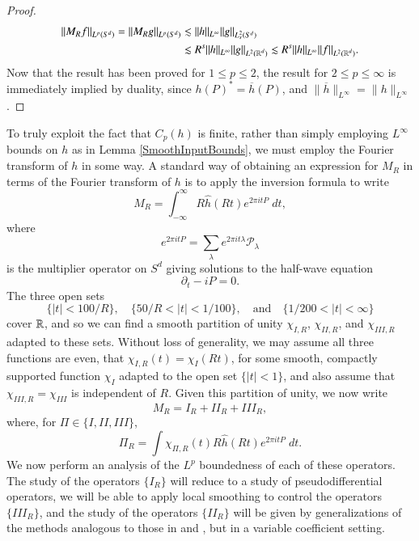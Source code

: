 \begin{proof}
    \begin{align*}
        \| M_R f \|_{L^p(S^d)} = \| M_R g \|_{L^p(S^d)} &\lesssim \| h \|_{L^\infty} \| g \|_{L^2_s(S^d)}\\
        &\lesssim R^s \| h \|_{L^\infty} \| g \|_{L^2(\operatorname{\mathbb{R}}^d)} \lesssim R^s \| h \|_{L^\infty} \| f \|_{L^2(\operatorname{\mathbb{R}}^d)}.
    \end{align*}
    Now that the result has been proved for $1 \leq p \leq 2$, the result for $2 \leq p \leq \infty$ is immediately implied by duality, since $h(P)^* = \overline{h}(P)$, and $\| \overline{h} \|_{L^\infty} = \| h \|_{L^\infty}$.
\end{proof}


To truly exploit the fact that $C_p(h)$ is finite, rather than simply employing $L^\infty$ bounds on $h$ as in Lemma \ref{SmoothInputBounds}, we must employ the Fourier transform of $h$ in some way. A standard way of obtaining an expression for $M_R$ in terms of the Fourier transform of $h$ is to apply the inversion formula to write
%
\[ M_R = \int_{-\infty}^\infty R \widehat{h}(Rt) e^{2 \pi i t P}\; dt, \]
%
where
%
\[ e^{2 \pi i t P} = \sum_\lambda e^{2 \pi i t \lambda} \mathcal{P}_\lambda \]
%
is the multiplier operator on $S^d$ giving solutions to the half-wave equation
%
\[ \partial_t - i P = 0. \]
%
%
%
%
%
%
%
The three open sets
%
\[ \{ |t| < 100/R \}, \quad \{ 50/R < |t| < 1/100 \}, \quad\text{and}\quad \{ 1/200 < |t| < \infty \} \]
%
cover $\operatorname{\mathbb{R}}$, and so we can find a smooth partition of unity $\chi_{I,R}$, $\chi_{II,R}$, and $\chi_{III,R}$ adapted to these sets. Without loss of generality, we may assume all three functions are even, that $\chi_{I,R}(t) = \chi_I(Rt)$, for some smooth, compactly supported function $\chi_I$ adapted to the open set $\{ |t| < 1 \}$, and also assume that $\chi_{III,R} = \chi_{III}$ is independent of $R$. Given this partition of unity, we now write
%
\[ M_R = I_R + II_R + III_R, \]
%
where, for $\Pi \in \{ I, II, III \}$,
%
\[ \Pi_R = \int \chi_{\Pi,R}(t) R \widehat{h}(Rt) e^{2 \pi i t P}\; dt. \]
%
We now perform an analysis of the $L^p$ boundedness of each of these operators. The study of the operators $\{ I_R \}$ will reduce to a study of pseudodifferential operators, we will be able to apply local smoothing to control the operators $\{ III_R \}$, and the study of the operators $\{ II_R \}$ will be given by generalizations of the methods analogous to those in \cite{HeoandNazarovandSeeger} and \cite{LeeSeeger}, but in a variable coefficient setting.




